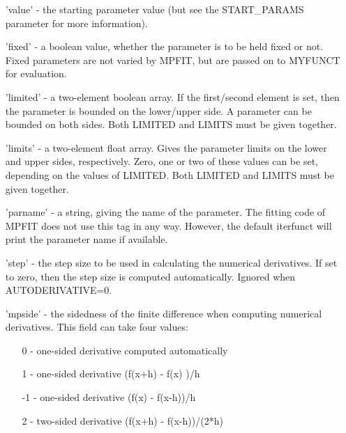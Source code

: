 \begin{itemize}

    \item['value' -] the starting parameter value (but see the START\_PARAMS
        parameter for more information).

    \item['fixed' -] a boolean value, whether the parameter is to be held
        fixed or not.  Fixed parameters are not varied by
        MPFIT, but are passed on to MYFUNCT for evaluation.

    \item['limited' -] a two-element boolean array.  If the first/second
        element is set, then the parameter is bounded on the
        lower/upper side.  A parameter can be bounded on both
        sides.  Both LIMITED and LIMITS must be given
        together.

    \item['limits' -] a two-element float array.  Gives the
        parameter limits on the lower and upper sides,
        respectively.  Zero, one or two of these values can be
        set, depending on the values of LIMITED.  Both LIMITED
        and LIMITS must be given together.

    \item['parname' -] a string, giving the name of the parameter.  The
        fitting code of MPFIT does not use this tag in any
        way.  However, the default iterfunct will print the
        parameter name if available.

   \item['step' -] the step size to be used in calculating the numerical
        derivatives.  If set to zero, then the step size is
        computed automatically.  Ignored when AUTODERIVATIVE=0.

    \item['mpside' -] the sidedness of the finite difference when computing
        numerical derivatives.  This field can take four values:
        \begin{itemize}
            \item[0 -] one-sided derivative computed automatically
            \item[1 -] one-sided derivative (f(x+h) - f(x)  )/h
            \item[-1 -] one-sided derivative (f(x)   - f(x-h))/h
            \item[2 -] two-sided derivative (f(x+h) - f(x-h))/(2*h)
        \end{itemize}


\end{itemize}
